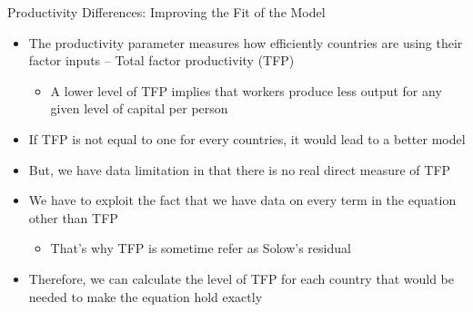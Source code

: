 \documentclass[aspectratio=1610]{beamer}
\begin{document}
%	
%		

\begin{frame}[wide]{Productivity Differences: Improving the Fit of the Model}
	\begin{itemize}
		\item 	The productivity parameter measures how efficiently countries are using their factor inputs -- Total factor productivity (TFP)
		\begin{itemize}
			\item A lower level of TFP implies that workers produce less output for any given level of capital per person
		\end{itemize}
		\item If TFP is not equal to one for every countries, it would lead to a better model
		\item But, we have data limitation in that there is no real direct measure of TFP
		\item We have to exploit the fact that we have data on every term in the equation other than TFP
		\begin{itemize}
			\item That's why TFP is sometime refer as Solow's residual
		\end{itemize}
		\item Therefore, we can calculate the level of TFP for each country that would be needed to make the equation hold exactly 
	\end{itemize}
\end{frame}
\end{document}
